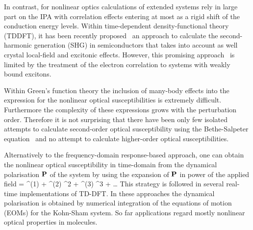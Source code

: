 In contrast, for nonlinear optics \ai calculations of extended systems rely in large part on the IPA\cite{PhysRevB.48.11705} with correlation effects entering at most as a rigid shift of the conduction energy levels\cite{PhysRevB.80.155205}.  Within time-dependent density-functional theory (TDDFT), it has been recently proposed~\cite{PhysRevB.82.235201} an approach to calculate the second-harmonic generation (SHG) in semiconductors that takes into account as well crystal local-field and excitonic effects. However, this promising approach~\cite{Cazzanelli2012} is limited by the treatment of the electron correlation to systems with weakly bound excitons.~\cite{LRC} 

Within Green's function theory the inclusion of many-body effects into the expression for the nonlinear optical susceptibilities is extremely difficult. 
Furthermore the complexity of these expressions grows with the perturbation order. Therefore it is not surprising that there have been only few isolated attempts to calculate second-order optical susceptibility using the Bethe-Salpeter equation~\cite{Leitsmann2005,Chang2002} and no attempt to calculate higher-order optical susceptibilities.~\cite{PhysRevB.80.165318} 

Alternatively to the frequency-domain response-based approach, one can obtain the nonlinear optical susceptibility in time-domain from the dynamical polarisation ${\bf P}$ of the system by using the expansion of ${\bf P}$ in power of the applied field
\be
\label{eq:peopbf}
\PP= \chi^{(1)} \efield + \chi^{(2)} \efield^2 + \chi^{(3)} \efield^3 + \dots 
\ee 
This strategy is followed in several real-time implementations of TD-DFT\cite{PhysRevB.54.4484}. In these approaches the dynamical polarisation is obtained by numerical integration of the equations of motion (EOMs) for the Kohn-Sham system.\cite{takimoto:154114,castro:3425,meng:054110} So far applications regard mostly nonlinear optical properties in molecules.  

